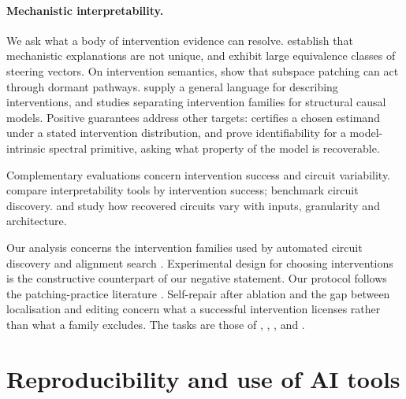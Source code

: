 \paragraph{Mechanistic interpretability.} We ask what a body of intervention evidence can resolve.
\citet{meloux2025everything} establish that mechanistic explanations are not unique, and
\citet{venkatesh2026steering} exhibit large equivalence classes of steering vectors. On intervention semantics,
\citet{makelov2024illusion} show that subspace patching can act through dormant pathways. \citet{geiger2025causal}
supply a general language for describing interventions, and \citet{eslami2026acif} studies separating intervention
families for structural causal models. Positive guarantees address other targets: \citet{asiaee2026cif} certifies a
chosen estimand under a stated intervention distribution, and \citet{dhor2026spectral} prove identifiability for a
model-intrinsic spectral primitive, asking what property of the model is recoverable. 

Complementary evaluations concern intervention success and circuit variability.
\citet{bhalla2025unifying} compare interpretability tools by intervention success; \citet{mueller2025mib} benchmark circuit discovery.
\citet{bayatmakou2026many} and \citet{venkatesh2026architecture} study how recovered circuits vary with inputs,
granularity and architecture. 

Our analysis concerns the intervention families used by automated circuit discovery
\citep{conmy2023acdc} and alignment search \citep{geiger2024das}.
Experimental design for choosing interventions \citep{tigas2022interventions} is the constructive counterpart of our negative statement.
Our protocol follows the patching-practice literature
\citep{zhang2024patching,heimersheim2024patching,goldowskydill2023pathpatching}. Self-repair after ablation \citep{mcgrath2023hydra} and the gap between localisation and editing
\citep{hase2023localization} concern what a successful intervention licenses rather than what a family excludes. The
tasks are those of \citet{wang2022ioi}, \citet{olsson2022induction}, \citet{hanna2023greater}, \citet{meng2022locating}
and \citet{finlayson2021causal}.

\section{Reproducibility and use of AI tools}
\label{app:repro}

